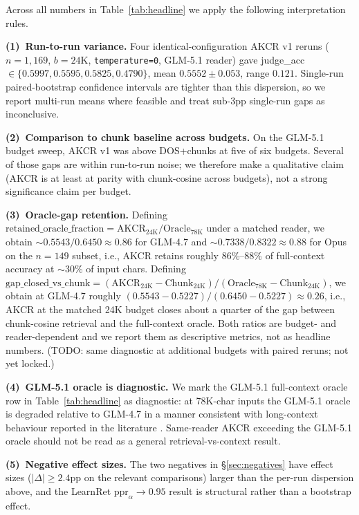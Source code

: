 \documentclass{article}
\theoremstyle{plain}
\theoremstyle{definition}
\theoremstyle{remark}
\begin{document}
Across all numbers in Table~\ref{tab:headline} we apply the following
interpretation rules.

\textbf{(1)~Run-to-run variance.} Four identical-configuration AKCR v1 reruns
($n\!=\!1{,}169$, $b\!=\!24$K, \texttt{temperature=0}, GLM-5.1 reader) gave
judge\_acc $\in\!\{0.5997,0.5595,0.5825,0.4790\}$, mean
$0.5552\!\pm\!0.053$, range $0.121$. Single-run paired-bootstrap confidence
intervals are tighter than this dispersion, so we report multi-run means
where feasible and treat sub-3pp single-run gaps as inconclusive.

\textbf{(2)~Comparison to chunk baseline across budgets.} On the GLM-5.1
budget sweep, AKCR v1 was above DOS+chunks at five of six budgets. Several
of those gaps are within run-to-run noise; we therefore make a qualitative
claim (AKCR is at least at parity with chunk-cosine across budgets), not a
strong significance claim per budget.

\textbf{(3)~Oracle-gap retention.} Defining
$\mathrm{retained\_oracle\_fraction} =
\mathrm{AKCR_{24K}} / \mathrm{Oracle_{78K}}$ under a matched reader, we
obtain $\sim$$0.5543/0.6450\!\approx\!0.86$ for GLM-4.7 and
$\sim$$0.7338/0.8322\!\approx\!0.88$ for Opus on the $n\!=\!149$ subset,
i.e., AKCR retains roughly $86\%$--$88\%$ of full-context accuracy at
$\sim$$30\%$ of input chars. Defining
$\mathrm{gap\_closed\_vs\_chunk} = (\mathrm{AKCR_{24K}}\!-\!\mathrm{Chunk_{24K}})
/ (\mathrm{Oracle_{78K}}\!-\!\mathrm{Chunk_{24K}})$, we obtain at GLM-4.7
roughly $(0.5543\!-\!0.5227)/(0.6450\!-\!0.5227)\!\approx\!0.26$, i.e.,
AKCR at the matched 24K budget closes about a quarter of the gap between
chunk-cosine retrieval and the full-context oracle. Both ratios are
budget- and reader-dependent and we report them as descriptive metrics, not
as headline numbers. (\textsc{TODO}: same diagnostic at additional budgets
with paired reruns; not yet locked.)

\textbf{(4)~GLM-5.1 oracle is diagnostic.} We mark the GLM-5.1 full-context
oracle row in Table~\ref{tab:headline} as diagnostic: at 78K-char inputs
the GLM-5.1 oracle is degraded relative to GLM-4.7 in a manner consistent
with long-context behaviour reported in the literature
\citep{liu2024lostinmiddle}. Same-reader AKCR exceeding the GLM-5.1 oracle
should not be read as a general retrieval-vs-context result.

\textbf{(5)~Negative effect sizes.} The two negatives in
\S\ref{sec:negatives} have effect sizes ($|\Delta|\!\geq\!2.4$pp on the
relevant comparisons) larger than the per-run dispersion above, and the
LearnRet $\mathrm{ppr}_\alpha\!\to\!0.95$ result is structural rather than
a bootstrap effect.
\end{document}
